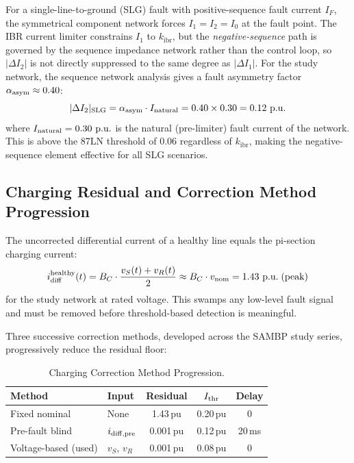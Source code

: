 \documentclass[journal,twoside,10pt]{IEEEtran}
\newcommand{\kibr}{k_{\mathrm{ibr}}}
\newcommand{\pu}{\,\text{p.u.}}
\begin{document}
For a single-line-to-ground (SLG) fault with positive-sequence fault current
$I_F$, the symmetrical component network forces $I_1 = I_2 = I_0$ at the
fault point.  The IBR current limiter constrains $I_1$ to $\kibr$, but the
\emph{negative-sequence} path is governed by the sequence impedance network
rather than the control loop, so $|\Delta I_2|$ is not directly suppressed
to the same degree as $|\Delta I_1|$.  For the study network, the sequence
network analysis gives a fault asymmetry factor $\alpha_{\rm asym} \approx
0.40$:
\begin{equation}
  |\Delta I_2|_{\rm SLG} = \alpha_{\rm asym} \cdot I_{\rm natural}
                          = 0.40 \times 0.30 = 0.12\,\pu
  \label{eq:I2slg}
\end{equation}
where $I_{\rm natural} = 0.30\,\pu$ is the natural (pre-limiter) fault current
of the network.  This is above the 87LN threshold of 0.06\,\pu regardless
of $\kibr$, making the negative-sequence element effective for all SLG scenarios.

\subsection{Charging Residual and Correction Method Progression}
\label{sec:chargingprog}

The uncorrected differential current of a healthy line equals the pi-section
charging current:
\begin{equation}
  i_{\rm diff}^{\rm healthy}(t) = B_C \cdot \frac{v_S(t) + v_R(t)}{2}
  \approx B_C \cdot v_{\rm nom} = 1.43\,\pu\;\text{(peak)}
  \label{eq:uncorrected}
\end{equation}
for the study network at rated voltage.  This swamps any low-level fault
signal and must be removed before threshold-based detection is meaningful.

Three successive correction methods, developed across the SAMBP study
series, progressively reduce the residual floor:

\begin{table}[!t]
\centering
\caption{Charging Correction Method Progression.}
\label{tab:corrections}
\renewcommand{\arraystretch}{1.05}
\begin{tabular}{llccc}
\toprule
Method & Input & Residual & $I_{\rm thr}$ & Delay \\
\midrule
Fixed nominal        & None               & 1.43\,pu & 0.20\,pu & 0 \\
Pre-fault blind      & $i_{\rm diff,pre}$ & 0.001\,pu & 0.12\,pu & 20\,ms \\
Voltage-based (used) & $v_S,\,v_R$        & 0.001\,pu & 0.08\,pu & 0 \\
\bottomrule
\end{tabular}
\end{table}
\end{document}
